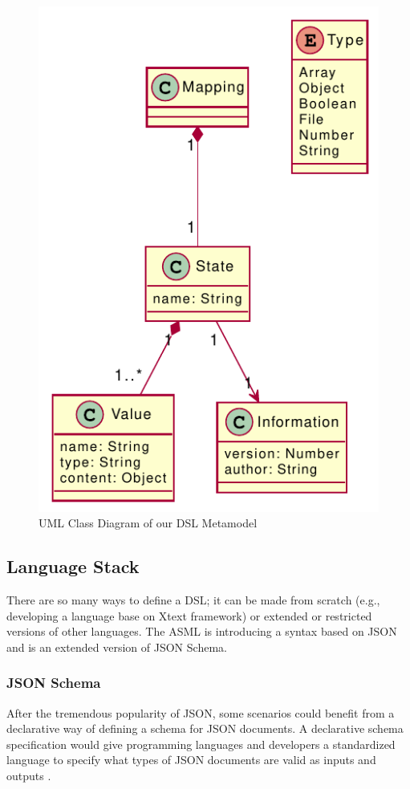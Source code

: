 \begin{figure}
    \includegraphics[scale=1]{../figures/asml-class-diagram}
    \centering
    \caption{UML Class Diagram of our DSL Metamodel}
    \label{fig:asml-meta-model}
\end{figure}

\subsection{Language Stack}
There are so many ways to define a DSL; it can be made from scratch (e.g., developing a language base on Xtext framework) or extended or restricted versions of other languages. The ASML is introducing a syntax based on JSON and is an extended version of JSON Schema. 


\subsubsection{JSON Schema}
After the tremendous popularity of JSON, some scenarios could benefit from a declarative way of defining a schema for JSON documents.
A declarative schema specification would give programming languages and developers a standardized language to specify what types of JSON documents are valid as inputs and outputs \cite{json-schema}.

